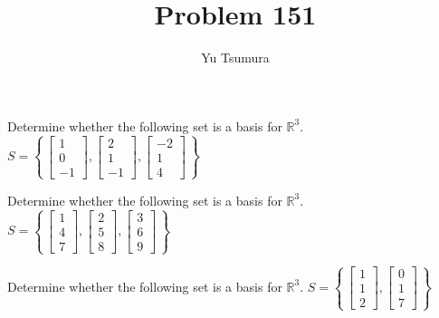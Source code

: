 \documentclass{ximera}
\title{Problem 151}
\author{Yu Tsumura}
\begin{document}
\begin{problem}
  Determine whether the following set is a basis for $\mathbb{R}^3$.
  $S=\left\{\,  \begin{bmatrix}
      1 \\
      0 \\
      -1
    \end{bmatrix}, \begin{bmatrix}
      2 \\
      1 \\
      -1
    \end{bmatrix}, \begin{bmatrix}
      -2 \\
      1 \\
      4
    \end{bmatrix} \,\right\}$
  \begin{multipleChoice}
  \end{multipleChoice}
\end{problem}

\begin{problem}
  Determine whether the following set is a basis for $\mathbb{R}^3$.
  $S=\left\{\,  \begin{bmatrix}
      1 \\
      4 \\
      7
    \end{bmatrix}, \begin{bmatrix}
      2 \\
      5 \\
      8
    \end{bmatrix}, \begin{bmatrix}
      3 \\
      6 \\
      9
    \end{bmatrix} \,\right\}$
  \begin{multipleChoice}
  \end{multipleChoice}
\end{problem}

\begin{problem}
  Determine whether the following set is a basis for $\mathbb{R}^3$.
  $S=\left\{\,  \begin{bmatrix}
      1 \\
      1 \\
      2
    \end{bmatrix}, \begin{bmatrix}
      0 \\
      1 \\
      7
    \end{bmatrix} \,\right\}$
  \begin{multipleChoice}
  \end{multipleChoice}
\end{problem}
\end{document}
